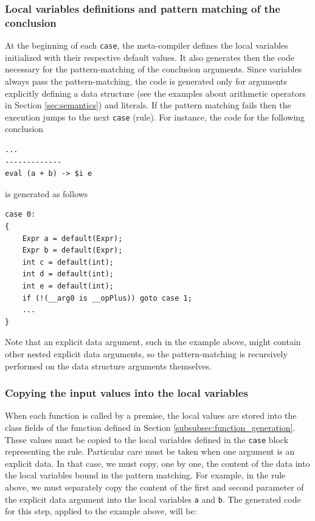 \subsubsection{Local variables definitions and pattern matching of the conclusion}

At the beginning of each \texttt{case}, the meta-compiler defines the local variables initialized with their respective default values. It also generates then the code necessary for the pattern-matching of the conclusion arguments. Since variables always pass the pattern-matching, the code is generated only for arguments explicitly defining a data structure (see the examples about arithmetic operators in Section \ref{sec:semantics}) and literals. If the pattern matching fails then the execution jumps to the next \texttt{case} (rule). For instance, the code for the following conclusion

\begin{lstlisting}
...
-------------
eval (a + b) -> $i e
\end{lstlisting}

\noindent
is generated as follows

\begin{lstlisting}
case 0:
{
	Expr a = default(Expr);
	Expr b = default(Expr);
	int c = default(int);
	int d = default(int);
	int e = default(int);
	if (!(__arg0 is __opPlus)) goto case 1;
	...
}
\end{lstlisting}

\noindent
Note that an explicit data argument, such in the example above, might contain other nested explicit data arguments, so the pattern-matching is recursively performed on the data structure arguments themselves.

\subsubsection{Copying the input values into the local variables}
When each function is called by a premise, the local values are stored into the class fields of the function defined in Section \ref{subsubsec:function_generation}. These values must be copied to the local variables defined in the \texttt{case} block representing the rule. Particular care must be taken when one argument is an explicit data. In that case, we must copy, one by one, the content of the data into the local variables bound in the pattern matching. For example, in the rule above, we must separately copy the content of the first and second parameter of the explicit data argument into the local variables \texttt{a} and \texttt{b}. The generated code for this step, applied to the example above, will be:

